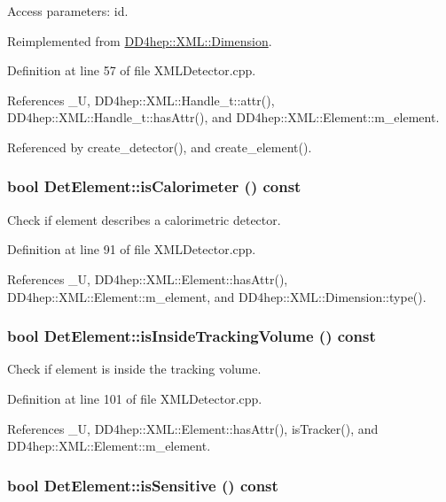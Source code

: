 Access parameters: id. 

Reimplemented from \hyperlink{struct_d_d4hep_1_1_x_m_l_1_1_dimension_a60d036beca11ef19a6843c24b96151d9}{DD4hep::XML::Dimension}.

Definition at line 57 of file XMLDetector.cpp.

References \_\-U, DD4hep::XML::Handle\_\-t::attr(), DD4hep::XML::Handle\_\-t::hasAttr(), and DD4hep::XML::Element::m\_\-element.

Referenced by create\_\-detector(), and create\_\-element().\hypertarget{struct_d_d4hep_1_1_x_m_l_1_1_det_element_a43510a1404429db0c01fc1e847c98ec9}{
\subsubsection[{isCalorimeter}]{\setlength{\rightskip}{0pt plus 5cm}bool DetElement::isCalorimeter () const}}
\label{struct_d_d4hep_1_1_x_m_l_1_1_det_element_a43510a1404429db0c01fc1e847c98ec9}


Check if element describes a calorimetric detector. 

Definition at line 91 of file XMLDetector.cpp.

References \_\-U, DD4hep::XML::Element::hasAttr(), DD4hep::XML::Element::m\_\-element, and DD4hep::XML::Dimension::type().\hypertarget{struct_d_d4hep_1_1_x_m_l_1_1_det_element_a467c07e590ae2d7162c66d3472e9215b}{
\subsubsection[{isInsideTrackingVolume}]{\setlength{\rightskip}{0pt plus 5cm}bool DetElement::isInsideTrackingVolume () const}}
\label{struct_d_d4hep_1_1_x_m_l_1_1_det_element_a467c07e590ae2d7162c66d3472e9215b}


Check if element is inside the tracking volume. 

Definition at line 101 of file XMLDetector.cpp.

References \_\-U, DD4hep::XML::Element::hasAttr(), isTracker(), and DD4hep::XML::Element::m\_\-element.\hypertarget{struct_d_d4hep_1_1_x_m_l_1_1_det_element_a5951ac81186673b5ecd480884cf52c96}{
\subsubsection[{isSensitive}]{\setlength{\rightskip}{0pt plus 5cm}bool DetElement::isSensitive () const}}
\label{struct_d_d4hep_1_1_x_m_l_1_1_det_element_a5951ac81186673b5ecd480884cf52c96}


